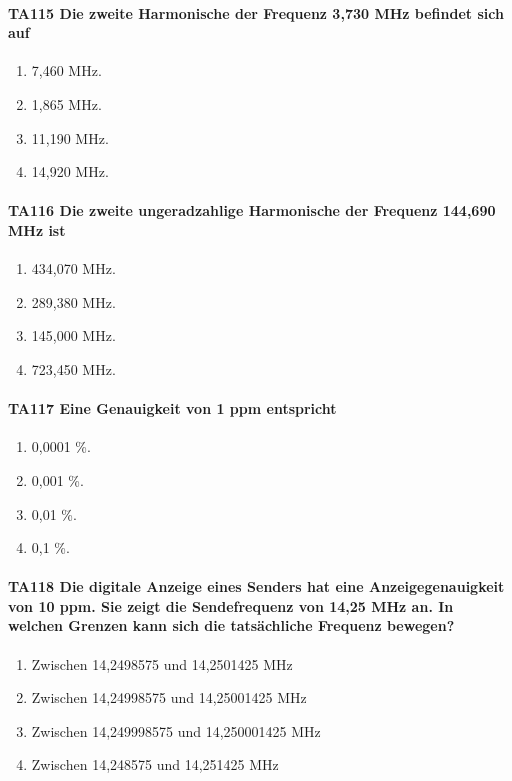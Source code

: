 \documentclass[8pt]{article}
\begin{document}
\begin{enumerate}
\paragraph*{TA115 Die zweite Harmonische der Frequenz 3,730 MHz befindet sich auf}
\begin{enumerate}[nolistsep,label=\Alph*]
\item 7,460 MHz.
\item 1,865 MHz.
\item 11,190 MHz.
\item 14,920 MHz.
\end{enumerate}



\paragraph*{TA116 Die zweite ungeradzahlige Harmonische der Frequenz 144,690 MHz ist}
\begin{enumerate}[nolistsep,label=\Alph*]
\item 434,070 MHz.
\item 289,380 MHz.
\item 145,000 MHz.
\item 723,450 MHz.
\end{enumerate}



\paragraph*{TA117 Eine Genauigkeit von 1 ppm entspricht}
\begin{enumerate}[nolistsep,label=\Alph*]
\item 0,0001 \%.
\item 0,001 \%.
\item 0,01 \%.
\item 0,1 \%.
\end{enumerate}



\paragraph*{TA118 Die digitale Anzeige eines Senders hat eine Anzeigegenauigkeit von 10 ppm. Sie zeigt die Sendefrequenz von 14,25 MHz an. In welchen Grenzen kann sich die tatsächliche Frequenz bewegen?}
\begin{enumerate}[nolistsep,label=\Alph*]
\item Zwischen 14,2498575 und 14,2501425 MHz
\item Zwischen 14,24998575 und 14,25001425 MHz
\item Zwischen 14,249998575 und 14,250001425 MHz
\item Zwischen 14,248575 und 14,251425 MHz
\end{enumerate}




\end{enumerate}
\end{document}
